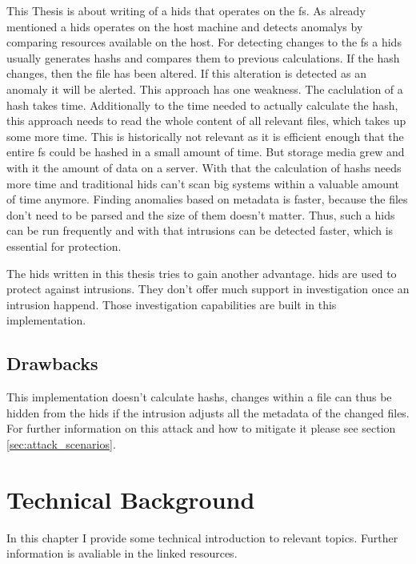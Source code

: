 \documentclass[
	a4paper,					%
	10pt,							%
	twoside,					%
	openright,				%
	notitlepage,			%
	parskip=half,			%
]{scrreprt}					%
\begin{document}
This Thesis is about writing of a \gls{hids} that operates on the \gls{fs}. As already mentioned a \gls{hids} operates on the host machine and detects \glspl{anomaly} by comparing resources available on the host. For detecting changes to the \gls{fs} a \gls{hids} usually generates \glspl{hash} and compares them to previous calculations. If the \gls{hash} changes, then the file has been altered. If this alteration is detected as an \gls{anomaly} it will be alerted. This approach has one weakness. The caclulation of a \gls{hash} takes time. Additionally to the time needed to actually calculate the hash, this approach needs to read the whole content of all relevant files, which takes up some more time. \cite{hash:slow, hash:speed} This is historically not relevant as it is efficient enough that the entire \gls{fs} could be hashed in a small amount of time. But storage media grew and with it the amount of data on a server. \cite{bruce:imaging} With that the calculation of \glspl{hash} needs more time and traditional \gls{hids} can't scan big systems within a valuable amount of time anymore. Finding anomalies based on \gls{metadata} is faster, because the files don't need to be parsed and the size of them doesn't matter. Thus, such a \gls{hids} can be run frequently and with that \glspl{intrusion} can be detected faster, which is essential for protection. \cite{inode}

The \gls{hids} written in this thesis tries to gain another advantage. \gls{hids} are used to protect against \glspl{intrusion}. They don't offer much support in \gls{investigation} once an \gls{intrusion} happend. Those \gls{investigation} capabilities are built in this implementation. 

\section{Drawbacks}

This implementation doesn't calculate \glspl{hash}, changes within a file can thus be hidden from the \gls{hids} if the intrusion adjusts all the \gls{metadata} of the changed files. For further information on this attack and how to mitigate it please see section \ref{sec:attack_scenarios}.

\chapter{Technical Background}

In this chapter I provide some technical introduction to relevant topics. Further information is avaliable in the linked resources.
\end{document}
